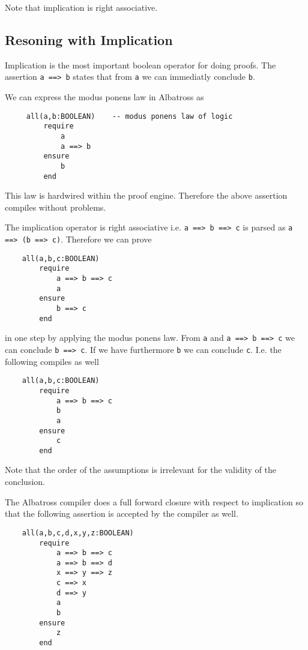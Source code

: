 Note that implication is right associative.

\subsection{Resoning with Implication}

Implication is the most important boolean operator for doing proofs. The
assertion \lstinline!a ==> b! states that from \lstinline!a! we can immediatly
conclude \lstinline!b!.

We can express the modus ponens law in Albatross as

\begin{lstlisting}
     all(a,b:BOOLEAN)    -- modus ponens law of logic
         require
             a
             a ==> b
         ensure
             b
         end
\end{lstlisting}

This law is hardwired within the proof engine. Therefore the above assertion
compiles without problems.


The implication operator is right associative i.e. \lstinline!a ==> b ==> c!
is parsed as \lstinline!a ==> (b ==> c)!. Therefore we can prove

\begin{lstlisting}
    all(a,b,c:BOOLEAN)
        require
            a ==> b ==> c
            a
        ensure
            b ==> c
        end
\end{lstlisting}

in one step by applying the modus ponens law. From \lstinline!a! and
\lstinline!a ==> b ==> c! we can conclude \lstinline!b ==> c!. If we have
furthermore \lstinline!b! we can conclude \lstinline!c!. I.e. the following
compiles as well


\begin{lstlisting}
    all(a,b,c:BOOLEAN)
        require
            a ==> b ==> c
            b
            a
        ensure
            c
        end
\end{lstlisting}

Note that the order of the assumptions is irrelevant for the validity of the
conclusion.

The Albatross compiler does a full forward closure with respect to implication
so that the following assertion is accepted by the compiler as well.

\begin{lstlisting}
    all(a,b,c,d,x,y,z:BOOLEAN)
        require
            a ==> b ==> c
            a ==> b ==> d
            x ==> y ==> z
            c ==> x
            d ==> y
            a
            b
        ensure
            z
        end
\end{lstlisting}


